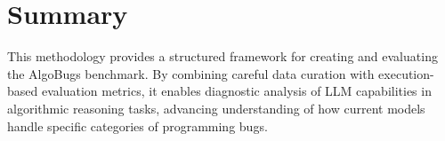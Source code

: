 \section{Summary}

This methodology provides a structured framework for creating and evaluating the AlgoBugs benchmark. By combining careful data curation with execution-based evaluation metrics, it enables diagnostic analysis of LLM capabilities in algorithmic reasoning tasks, advancing understanding of how current models handle specific categories of programming bugs.
